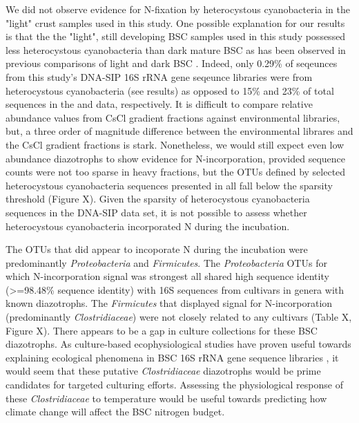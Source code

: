 We did not observe evidence for N-fixation by heterocystous cyanobacteria in the "light" crust samples used in this study. One possible explanation for our results is that the the "light", still developing BSC samples used in this study possessed less heterocystous cyanobacteria than dark mature BSC as has been observed in previous comparisons of light and dark BSC \cite{14766579}. Indeed, only 0.29\% of seqeunces from this study's DNA-SIP 16S rRNA gene seqeunce libraries were from heterocystous cyanobacteria (see results) as opposed to 15\% and 23\% of total sequences in the \citet{Steven_2013} and \citet{Garcia_Pichel_2013} data, respectively. It is difficult to compare relative abundance values from CsCl gradient fractions against environmental libraries, but, a three order of magnitude difference between the environmental librares and the CsCl gradient fractions is stark. Nonetheless, we would still expect even low abundance diazotrophs to show evidence for N-incorporation, provided sequence counts were not too sparse in heavy fractions, but the OTUs defined by selected heterocystous cyanobacteria sequences presented in \citet{Yeager} all fall below the sparsity threshold (Figure X). Given the sparsity of heterocystous cyanobacteria sequences in the DNA-SIP data set, it is not possible to assess whether heterocystous cyanobacteria incorporated N during the incubation.

The OTUs that did appear to incoporate N during the incubation were predominantly \textit{Proteobacteria} and \textit{Firmicutes}. The \textit{Proteobacteria} OTUs for which N-incorporation signal was strongest all shared high sequence identity (\textgreater=98.48\% sequence identity) with 16S sequences from cultivars in genera with known diazotrophs. The \textit{Firmicutes} that displayed signal for N-incorporation (predominantly \textit{Clostridiaceae}) were not closely related to any cultivars (Table X, Figure X). There appears to be a gap in culture collections for these BSC diazotrophs. As culture-based ecophysiological studies have proven useful towards explaining ecological phenomena in BSC 16S rRNA gene sequence libraries \cite{Garcia_Pichel_2013}, it would seem that these putative \textit{Clostridiaceae} diazotrophs would be prime candidates for targeted culturing efforts. Assessing the physiological response of these \textit{Clostridiaceae} to temperature would be useful towards predicting how climate change will affect the BSC nitrogen budget. 

